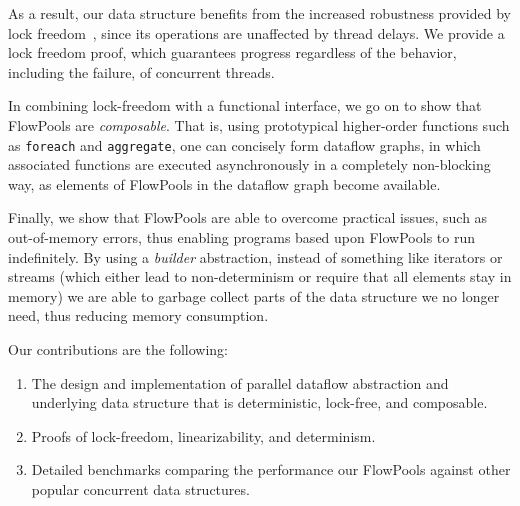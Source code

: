 \documentclass[runningheads,a4paper]{llncs}
\begin{document}
As a result, our data structure benefits from the increased robustness
provided by lock freedom~\cite{Herlihy90}, since its operations are unaffected
by thread delays. We provide a lock freedom proof, which guarantees progress
regardless of the behavior, including the failure, of concurrent threads.

In combining lock-freedom with a functional interface, we go on to show that
FlowPools are \textit{composable}. That is, using prototypical higher-order
functions such as \verb=foreach= and \verb=aggregate=, one can concisely form
dataflow graphs, in which associated functions are executed asynchronously in
a completely non-blocking way, as elements of FlowPools in the dataflow graph
become available.

Finally, we show that FlowPools are able to overcome practical issues, such as
out-of-memory errors, thus enabling programs based upon FlowPools to run
indefinitely. By using a \textit{builder} abstraction, instead of something
like iterators or streams (which either lead to non-determinism or require
that all elements stay in memory) we are able to garbage collect parts of the
data structure we no longer need, thus reducing memory consumption.

Our contributions are the following:
\begin{enumerate}
\item The design and implementation of parallel dataflow abstraction and
underlying data structure that is deterministic, lock-free, and composable.
\item Proofs of lock-freedom, linearizability, and determinism.
\item Detailed benchmarks comparing the performance our FlowPools against
other popular concurrent data structures.
\end{enumerate}



\end{document}
